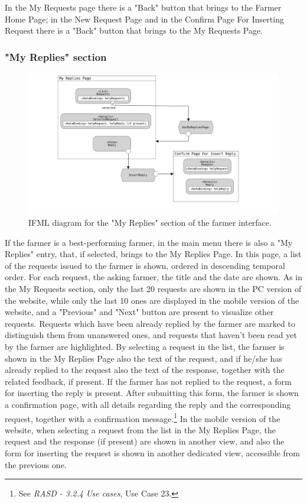 \documentclass{article}
\begin{document}
\newline
In the My Requests page there is a "Back" button that brings to the Farmer Home Page; in the New Request Page and in the Confirm Page For Inserting Request there is a "Back" button that brings to the My Requests Page.
\vspace{6cm}
\subsubsection{"My Replies" section}
\begin{figure}[H]
    \centering
     \includegraphics[scale=0.15]{diagrams/ui diagrams/farmer/my replies.png} 
    \caption{IFML diagram for the "My Replies" section of the farmer interface.}
\end{figure}
If the farmer is a best-performing farmer, in the main menu there is also a "My Replies" entry, that, if selected, brings to the My Replies Page. In this page, a list of the requests issued to the farmer is shown, ordered in descending temporal order. For each request, the asking farmer, the title and the date are shown. As in the My Requests section, only the last 20 requests are shown in the PC version of the website, while only the last 10 ones are displayed in the mobile version of the website, and a "Previous" and "Next" button are present to visualize other requests. Requests which have been already replied by the farmer are marked to distinguish them from unanswered ones, and requests that haven't been read yet by the farmer are highlighted. \newline
By selecting a request in the list, the farmer is shown in the My Replies Page also the text of the request, and if he/she has already replied to the request also the text of the response, together with the related feedback, if present.
If the farmer has not replied to the request, a form for inserting the reply is present. After submitting this form, the farmer is shown a confirmation page, with all details regarding the reply and the corresponding request, together with a confirmation message.\footnote{See \textit{RASD - 3.2.4 Use cases}, Use Case 23.} In the mobile version of the website, when selecting a request from the list in the My Replies Page, the request and the response (if present) are shown in another view, and also the form for inserting the request is shown in another dedicated view, accessible from the previous one.\newline
\end{document}
